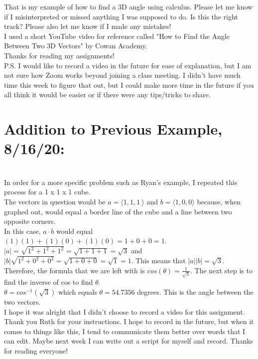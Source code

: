 \documentclass{article}
\begin{document}
That is my example of how to find a 3D angle using calculus. Please let me know if I misinterpreted or missed anything I was supposed to do. Is this the right track? Please also let me know if I made any mistakes!\\
I used a short YouTube video for reference called "How to Find the Angle Between Two 3D Vectors" by Cowan Academy.\\
Thanks for reading my assignments!\\
P.S. I would like to record a video in the future for ease of explanation, but I am not sure how Zoom works beyond joining a class meeting. I didn't have much time this week to figure that out, but I could make more time in the future if you all think it would be easier or if there were any tips/tricks to share.\\

\section*{Addition to Previous Example, 8/16/20:}\\
In order for a more specific problem such as Ryan's example, I repeated this process for a 1 x 1 x 1 cube.\\
The vectors in question would be $a = \langle 1,1,1 \
\rangle$ and $b = \langle 1,0,0 \rangle$ because, when graphed out, would equal a border line of the cube and a line between two opposite corners.\\
In this case, $a \cdot b$ would equal $(1)(1)+(1)(0)+(1)(0)=1+0+0=1$.\\
$|a|=\sqrt{1^2+1^2+1^2}=\sqrt{1+1+1}=\sqrt{3}$ and $|b|\sqrt{1^2+0^2+0^2}=\sqrt{1+0+0}=\sqrt{1}=1$. This means that $|a||b|=\sqrt{3}$.\\
Therefore, the formula that we are left with is $cos(\theta)=\frac{1}{\sqrt{3}}$. The next step is to find the inverse of cos to find $\theta$.\\
$\theta= cos^{-1}(\sqrt{3})$ which equals $\theta=54.7356$ degrees. This is the angle between the two vectors.\\
I hope it was alright that I didn't choose to record a video for this assignment. Thank you Ruth for your instructions. I hope to record in the future, but when it comes to things like this, I tend to communicate them better over words that I can edit. Maybe next week I can write out a script for myself and record. Thanks for reading everyone!\\
\end{document}

